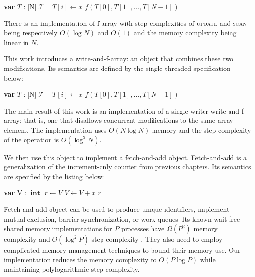 \documentclass{thesis}
\def\T{\ensuremath{\operatorname{\mathcal{T}}}\text{ }}
\def\int{\ensuremath{\operatorname{\textbf{int}}}}
\newcommand{\fn}[1]{\textsc{#1}}
\newcommand{\var}[2]{\textbf{var }#1 : #2}
\newcommand{\arrayspec}[1]{\text{array}[#1]\text{ of }}
\begin{document}
\begin{algorithmic}[1]
	\State\var{$T$}{\arrayspec{N}$\T$}
	\State $T[i] \gets x$
\EndFunction
{}
	\State\Return $f(T[0], T[1], \ldots, T[N-1])$
\EndFunction
\end{algorithmic}

There is an implementation of f-array with step complexities of \fn{update} and \fn{scan} being respectively $O(\log N)$ and $O(1)$ and the memory complexity
being linear in $N$.

This work introduces a write-and-f-array: an object that combines these two modifications. Its semantics are defined by the single-threaded specification below:

\begin{algorithmic}[1]
	\State\var{$T$}{\arrayspec{N}$\T$}
		\State $T[i] \gets x$
		\State\Return $f(T[0], T[1], \ldots, T[N-1])$
	\EndFunction
\end{algorithmic}

The main result of this work is an implementation of a single-writer
write-and-f-array: that is, one that disallows concurrent modifications to the same array element. The implementation
uses $O(N\log{}N)$ memory and the step complexity of the operation is $O(\log^3N)$. 

We then use this object to implement a fetch-and-add object. Fetch-and-add is a generalization of the increment-only counter from previous chapters. Its semantics are specified by the listing below:

\begin{algorithmic}[1]
\State\var{V}{\int}
	\State $r \gets V$
	\State $V \gets V + x$
	\State\Return $r$
\EndFunction
\end{algorithmic}


Fetch-and-add object can be used to produce unique identifiers, implement
mutual exclusion, barrier synchronization\cite{faa-sync}, or work queues\cite{faa-queue}. Its known wait-free shared memory implementations for $P$ processes have $\Omega(P^2)$ memory complexity and $O(\log^2 P)$ step complexity
\cite{ellen-fai}\cite{closed-object}. They also need to employ complicated memory management techniques to bound their memory use. Our implementation reduces the memory complexity to $O(P\log P)$ while maintaining polylogarithmic step complexity.
\end{document}
